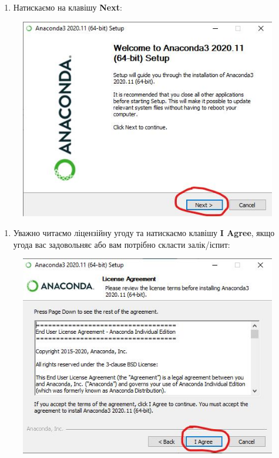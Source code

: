 \documentclass[
  letterpaper,
]{report}
\providecommand{\tightlist}{%
  \setlength{\itemsep}{0pt}\setlength{\parskip}{0pt}}\usepackage{longtable,booktabs,array}
\begin{document}
\begin{enumerate}
\def\labelenumi{\arabic{enumi}.}
\setcounter{enumi}{4}
\tightlist
\item
  Натискаємо на клавішу \textbf{Next}:
\end{enumerate}

\begin{figure}

{\centering \includegraphics{Images/ap1/Screenshot_6.jpg}

}

\end{figure}

\begin{enumerate}
\def\labelenumi{\arabic{enumi}.}
\setcounter{enumi}{5}
\tightlist
\item
  Уважно читаємо ліцензійну угоду та натискаємо клавішу \textbf{I
  Agree}, якщо угода вас задовольняє або вам потрібно скласти
  залік/іспит:
\end{enumerate}

\begin{figure}

{\centering \includegraphics{Images/ap1/Screenshot_7.jpg}

}

\end{figure}
\end{document}
